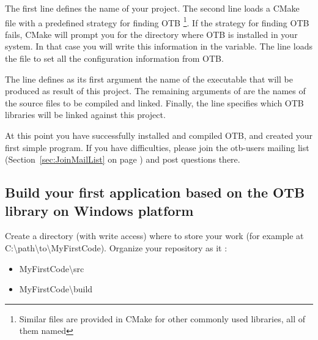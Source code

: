 \normalsize

The first line defines the name of your project. The second line loads a CMake file with a predefined strategy for finding OTB \footnote{Similar files are provided in CMake for other commonly used libraries, all of them named }. If the strategy for finding OTB fails, CMake will prompt you for the directory where OTB is installed in your system. In that case you will write this information in the  variable. The line  loads the  file to set all the configuration information from OTB.

The line  defines as its first argument the name of the executable that will be produced as result of this project. The remaining arguments of  are the names of the source files to be compiled and linked.  Finally, the  line specifies which OTB libraries will be linked against this project.



At this point you have successfully installed and compiled OTB, and created your first simple program. If you have difficulties, please join the otb-users mailing list (Section~\ref{sec:JoinMailList} on page \pageref{sec:JoinMailList}) and post questions there.


\subsection{Build your first application based on the OTB library on Windows platform}
\label{sec:FirstWinAppOTB}

Create a directory (with write access) where to store your work (for example at C:\textbackslash path\textbackslash to\textbackslash MyFirstCode).
Organize your repository as it :
\begin{itemize}
\item MyFirstCode\textbackslash src
\item MyFirstCode\textbackslash build
\end{itemize}

